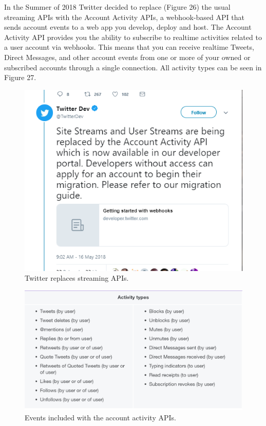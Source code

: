 \documentclass[12pt]{article} %
\begin{document}
\begin{enumerate}
		In the Summer of 2018 Twitter decided to replace (Figure 26) the usual streaming APIs with the Account Activity APIs,  a webhook-based API 
		that sends account events to a web app you develop, deploy and host.
		The Account Activity API provides you the ability to subscribe to realtime activities related to a user account via webhooks.
		This means that you can receive realtime Tweets, Direct Messages, and other account events from one or more of your owned or subscribed accounts 
		through a single connection. All activity types can be seen in Figure 27.
		\begin{figure}[H] %
		\includegraphics[width=0.7\linewidth]{images/deprecatedStream}
		\caption{Twitter replaces streaming APIs.}
		\label{deprecatedStream}
		\end{figure}

		\begin{figure}[H] %
		\includegraphics[width=1\linewidth]{images/activityAPIs}
		\caption{Events included with the account activity APIs.}
		\label{activityAPIs}
		\end{figure}


\end{enumerate}
\end{document}

